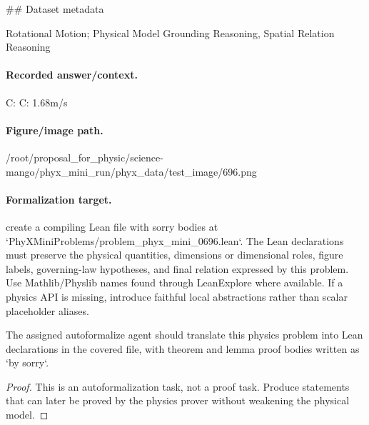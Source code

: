 \#\# Dataset metadata

Rotational Motion; Physical Model Grounding Reasoning, Spatial Relation Reasoning

\paragraph{Recorded answer/context.}
C: C: 1.68m/s

\paragraph{Figure/image path.}
/root/proposal\_for\_physic/science-mango/phyx\_mini\_run/phyx\_data/test\_image/696.png

\paragraph{Formalization target.}
create a compiling Lean file with sorry bodies at `PhyXMiniProblems/problem\_phyx\_mini\_0696.lean`. The Lean declarations must preserve the physical quantities, dimensions or dimensional roles, figure labels, governing-law hypotheses, and final relation expressed by this problem.
Use Mathlib/Physlib names found through LeanExplore where available. If a physics API is missing, introduce faithful local abstractions rather than scalar placeholder aliases.

\begin{theorem}
\label{thm:physics:phyx_mini_0696:target}
The assigned autoformalize agent should translate this physics problem into Lean declarations in the covered file, with theorem and lemma proof bodies written as `by sorry`.
\end{theorem}
\begin{proof}
This is an autoformalization task, not a proof task. Produce statements that can later be proved by the physics prover without weakening the physical model.
\end{proof}

